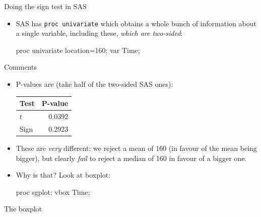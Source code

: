 \documentclass[unknownkeysallowed]{beamer}\usepackage[]{graphicx}\usepackage[]{color}
\begin{document}
\begin{frame}[fragile]{Doing the sign test in SAS}
  
  \begin{itemize}
  \item SAS has \texttt{proc univariate} which obtains a whole bunch
    of information about a single variable, including these,
    \emph{which are two-sided}:
    
    \begin{Sascode}[store=im]
proc univariate location=160;
  var Time;
    \end{Sascode}
    
  \end{itemize}
  
\end{frame}

\begin{frame}[fragile]{Comments}
  \begin{itemize}
  \item P-values are (take half of the two-sided SAS ones):
    
    \begin{center}
    \begin{tabular}{lr}
      Test & P-value\\
      \hline
      $t$ & 0.0392\\
      Sign & 0.2923\\
      \hline
    \end{tabular}
      
    \end{center}
  \item These are \emph{very} different: we reject a mean of 160 (in
    favour of the mean being bigger), but clearly \emph{fail} to reject a
    median of 160 in favour of a bigger one.
  \item Why is that? Look at boxplot:
    
    \begin{Sascode}[store=in]
proc sgplot;
  vbox Time;
    \end{Sascode}
  \end{itemize}
\end{frame}

\begin{frame}[fragile]{The boxplot}
  

  
\end{frame}
\end{document}
